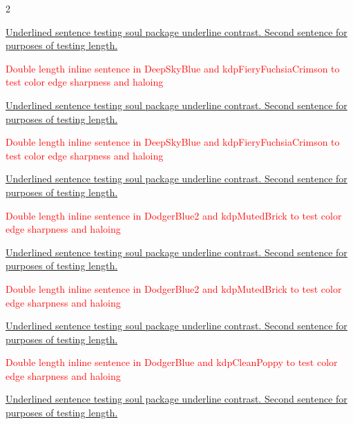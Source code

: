 \begin{multicols}{2}
\clearpage
{}
\par\noindent\ul{Underlined sentence testing soul package underline contrast. Second sentence for purposes of testing length.}
\par\noindent\textcolor{Red}{Double length inline sentence in DeepSkyBlue and kdpFieryFuchsiaCrimson to test color edge sharpness and haloing}
\clearpage
{}
\par\noindent\ul{Underlined sentence testing soul package underline contrast. Second sentence for purposes of testing length.}
\par\noindent\textcolor{Red}{Double length inline sentence in DeepSkyBlue and kdpFieryFuchsiaCrimson to test color edge sharpness and haloing}
\clearpage
{}
\par\noindent\ul{Underlined sentence testing soul package underline contrast. Second sentence for purposes of testing length.}
\par\noindent\textcolor{Red}{Double length inline sentence in DodgerBlue2 and kdpMutedBrick to test color edge sharpness and haloing}
\clearpage
{}
\par\noindent\ul{Underlined sentence testing soul package underline contrast. Second sentence for purposes of testing length.}
\par\noindent\textcolor{Red}{Double length inline sentence in DodgerBlue2 and kdpMutedBrick to test color edge sharpness and haloing}
\clearpage
{}
\par\noindent\ul{Underlined sentence testing soul package underline contrast. Second sentence for purposes of testing length.}
\par\noindent\textcolor{Red}{Double length inline sentence in DodgerBlue and kdpCleanPoppy to test color edge sharpness and haloing}
\clearpage
{}
\par\noindent\ul{Underlined sentence testing soul package underline contrast. Second sentence for purposes of testing length.}

\end{multicols}
